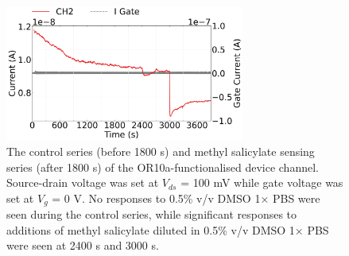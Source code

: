 \documentclass[
  a4paper,
]{scrbook}
\begin{document}
\begin{figure}

{\centering \includegraphics[width=0.7\textwidth,height=\textheight]{figures/ch7/NTQ39C7_OR10avihis_MeSalsensing_240403.png}

}

\caption[The control series and methyl salicylate sensing series of the
OR10a-functionalised device channel.]{\label{fig-MeSal-sensing}The
control series (before 1800 s) and methyl salicylate sensing series
(after 1800 s) of the OR10a-functionalised device channel. Source-drain
voltage was set at \(V_{ds}\) = 100 mV while gate voltage was set at
\(V_g\) = 0 V. No responses to 0.5\% v/v DMSO 1× PBS were seen during
the control series, while significant responses to additions of methyl
salicylate diluted in 0.5\% v/v DMSO 1× PBS were seen at 2400 s and 3000
s.}

\end{figure}
\end{document}
